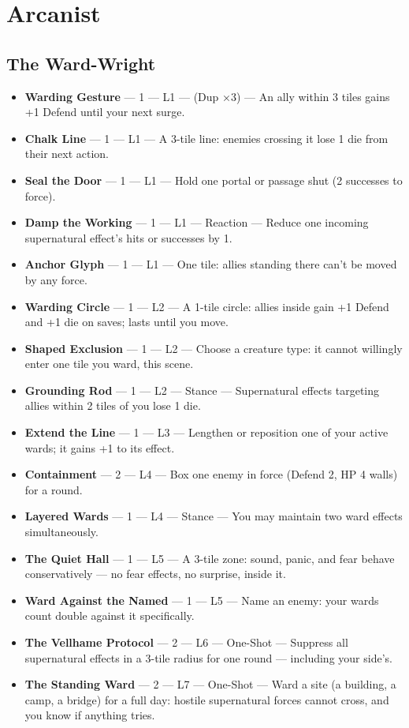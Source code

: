 \section{Arcanist}

\subsection{The Ward-Wright}
\begin{itemize}
    \item \textbf{Warding Gesture} --- 1 --- L1 --- (Dup ×3) --- An ally within 3 tiles gains +1 Defend until your next surge.
    \item \textbf{Chalk Line} --- 1 --- L1 --- A 3-tile line: enemies crossing it lose 1 die from their next action.
    \item \textbf{Seal the Door} --- 1 --- L1 --- Hold one portal or passage shut (2 successes to force).
    \item \textbf{Damp the Working} --- 1 --- L1 --- Reaction --- Reduce one incoming supernatural effect's hits or successes by 1.
    \item \textbf{Anchor Glyph} --- 1 --- L1 --- One tile: allies standing there can't be moved by any force.
    \item \textbf{Warding Circle} --- 1 --- L2 --- A 1-tile circle: allies inside gain +1 Defend and +1 die on saves; lasts until you move.
    \item \textbf{Shaped Exclusion} --- 1 --- L2 --- Choose a creature type: it cannot willingly enter one tile you ward, this scene.
    \item \textbf{Grounding Rod} --- 1 --- L2 --- Stance --- Supernatural effects targeting allies within 2 tiles of you lose 1 die.
    \item \textbf{Extend the Line} --- 1 --- L3 --- Lengthen or reposition one of your active wards; it gains +1 to its effect.
    \item \textbf{Containment} --- 2 --- L4 --- Box one enemy in force (Defend 2, HP 4 walls) for a round.
    \item \textbf{Layered Wards} --- 1 --- L4 --- Stance --- You may maintain two ward effects simultaneously.
    \item \textbf{The Quiet Hall} --- 1 --- L5 --- A 3-tile zone: sound, panic, and fear behave conservatively --- no fear effects, no surprise, inside it.
    \item \textbf{Ward Against the Named} --- 1 --- L5 --- Name an enemy: your wards count double against it specifically.
    \item \textbf{The Vellhame Protocol} --- 2 --- L6 --- One-Shot --- Suppress all supernatural effects in a 3-tile radius for one round --- including your side's.
    \item \textbf{The Standing Ward} --- 2 --- L7 --- One-Shot --- Ward a site (a building, a camp, a bridge) for a full day: hostile supernatural forces cannot cross, and you know if anything tries.
\end{itemize}

